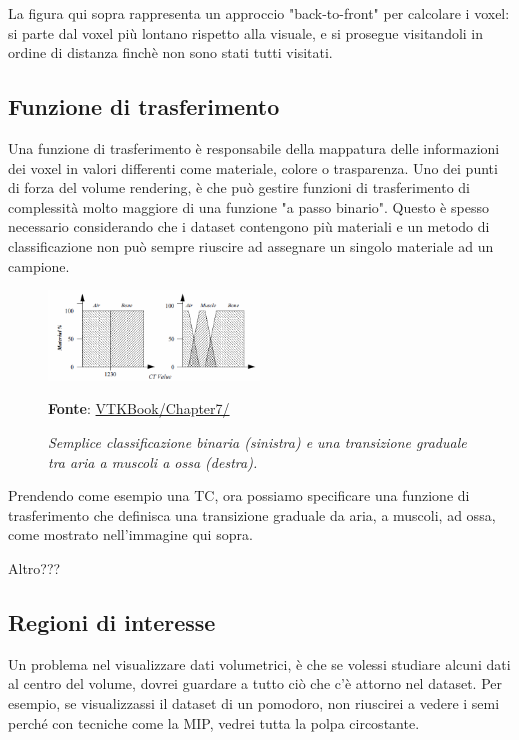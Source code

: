 La figura qui sopra rappresenta un approccio "back-to-front" per calcolare i voxel: si parte dal voxel più lontano rispetto alla visuale, e si prosegue visitandoli in ordine di distanza finchè non sono stati tutti visitati.

\subsection{Funzione di trasferimento}\label{sec:funzione-trasferimento}
Una funzione di trasferimento è responsabile della mappatura delle informazioni dei voxel in valori differenti come materiale, colore o trasparenza. Uno dei punti di forza del volume rendering, è che può gestire funzioni di trasferimento di complessità molto maggiore di una funzione "a passo binario". Questo è spesso necessario considerando che i dataset contengono più materiali e un metodo di classificazione non può sempre riuscire ad assegnare un singolo materiale ad un campione.

\begin{figure}[h]
    \centering
    \includegraphics[width=0.5\textwidth]{immagini/volumerendering/functions.png}
    \caption{\textit{Semplice classificazione binaria (sinistra) e una transizione graduale tra aria a muscoli a ossa (destra).}}
    \textbf{Fonte}: \href{https://lorensen.github.io/VTKExamples/site/VTKBook/07Chapter7/}{VTKBook/Chapter7/}
    \label{fig: Volume Rendering Object-Order}
\end{figure}

Prendendo come esempio una TC, ora possiamo specificare una funzione di trasferimento che definisca una transizione graduale da aria, a muscoli, ad ossa, come mostrato nell'immagine qui sopra.

Altro???

\subsection{Regioni di interesse}\label{sec:regioni-di-interesse}
Un problema nel visualizzare dati volumetrici, è che se volessi studiare alcuni dati al centro del volume, dovrei guardare a tutto ciò che c'è attorno nel dataset. Per esempio, se visualizzassi il dataset di un pomodoro, non riuscirei a vedere i semi perché con tecniche come la MIP, vedrei tutta la polpa circostante.

